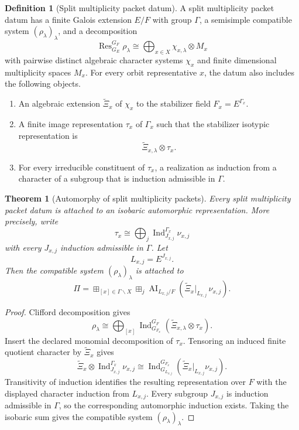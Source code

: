 \documentclass{aomart}
\newtheorem{theorem}{Theorem}[section]
\theoremstyle{definition}
\newtheorem{definition}[definition]{Definition}
\theoremstyle{remark}
\newcommand{\Ind}{\operatorname{Ind}}
\newcommand{\Res}{\operatorname{Res}}
\newcommand{\AI}{\operatorname{AI}}
\newcommand{\boxplusop}{\mathbin{\boxplus}}
\begin{document}
\begin{definition}[Split multiplicity packet datum]\label{def:split_multiplicity}
A split multiplicity packet datum has a finite Galois extension \(E/F\) with group \(\Gamma\), a semisimple compatible system \((\rho_\lambda)_\lambda\), and a decomposition
\[
\Res_{G_E}^{G_F}\rho_\lambda
\cong
\bigoplus_{x\in X}
\chi_{x,\lambda}\otimes M_x
\]
with pairwise distinct algebraic character systems \(\chi_x\) and finite dimensional multiplicity spaces \(M_x\). For every orbit representative \(x\), the datum also includes the following objects.

\begin{enumerate}
\item An algebraic extension \(\widetilde\Xi_x\) of \(\chi_x\) to the stabilizer field \(F_x=E^{\Gamma_x}\).
\item A finite image representation \(\tau_x\) of \(\Gamma_x\) such that the stabilizer isotypic representation is
\[
\widetilde\Xi_{x,\lambda}\otimes\tau_x.
\]
\item For every irreducible constituent of \(\tau_x\), a realization as induction from a character of a subgroup that is induction admissible in \(\Gamma\).
\end{enumerate}
\end{definition}

\begin{theorem}[Automorphy of split multiplicity packets]\label{thm:split_multiplicity_automorphy}
Every split multiplicity packet datum is attached to an isobaric automorphic representation. More precisely, write
\[
\tau_x
\cong
\bigoplus_j
\Ind_{J_{x,j}}^{\Gamma_x}\nu_{x,j}
\]
with every \(J_{x,j}\) induction admissible in \(\Gamma\). Let
\[
L_{x,j}=E^{J_{x,j}}.
\]
Then the compatible system \((\rho_\lambda)_\lambda\) is attached to
\[
\boxed{
\Pi
=
\boxplusop_{[x]\in\Gamma\backslash X}
\boxplusop_j
\AI_{L_{x,j}/F}
\left(
\widetilde\Xi_x|_{L_{x,j}}\,\nu_{x,j}
\right).
}
\]
\end{theorem}

\begin{proof}
Clifford decomposition gives
\[
\rho_\lambda
\cong
\bigoplus_{[x]}
\Ind_{G_{F_x}}^{G_F}
\left(
\widetilde\Xi_{x,\lambda}\otimes\tau_x
\right).
\]
Insert the declared monomial decomposition of \(\tau_x\). Tensoring an induced finite quotient character by \(\widetilde\Xi_x\) gives
\[
\widetilde\Xi_x\otimes
\Ind_{J_{x,j}}^{\Gamma_x}\nu_{x,j}
\cong
\Ind_{G_{L_{x,j}}}^{G_{F_x}}
\left(
\widetilde\Xi_x|_{L_{x,j}}\nu_{x,j}
\right).
\]
Transitivity of induction identifies the resulting representation over \(F\) with the displayed character induction from \(L_{x,j}\). Every subgroup \(J_{x,j}\) is induction admissible in \(\Gamma\), so the corresponding automorphic induction exists. Taking the isobaric sum gives the compatible system \((\rho_\lambda)_\lambda\).
\end{proof}
\end{document}
